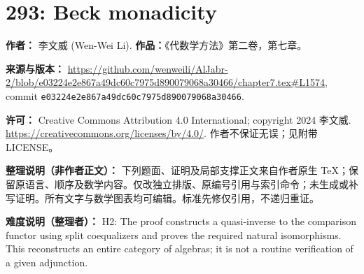 \documentclass[11pt]{article}
\theoremstyle{definition}
\begin{document}
\section*{293: Beck monadicity}
\noindent\textbf{作者：} 李文威 (Wen-Wei Li). \textbf{作品：}《代数学方法》第二卷，第七章。
\par\noindent\textbf{来源与版本：} \url{https://github.com/wenweili/AlJabr-2/blob/e03224e2e867a49dc60c7975d890079068a30466/chapter7.tex#L1574}, commit \texttt{e03224e2e867a49dc60c7975d890079068a30466}.
\par\noindent\textbf{许可：} Creative Commons Attribution 4.0 International; copyright 2024 李文威. \url{https://creativecommons.org/licenses/by/4.0/}. 作者不保证无误；见附带 LICENSE。
\par\noindent\textbf{整理说明（非作者正文）：} 下列题面、证明及局部支撑正文来自作者原生 TeX；保留原语言、顺序及数学内容。仅改独立排版、原编号引用与索引命令；未生成或补写证明。所有文字与数学图表均可编辑。标准先修仅引用，不递归重证。
\par\noindent\textbf{难度说明（整理者）：} H2: The proof constructs a quasi-inverse to the comparison functor using split coequalizers and proves the required natural isomorphisms. This reconstructs an entire category of algebras; it is not a routine verification of a given adjunction.
\end{document}
